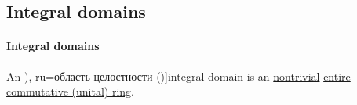 \subsection{Integral domains}\label{subsec:integral_domains}

\paragraph{Integral domains}

\begin{definition}\label{def:integral_domain}
  An \term[bg=област на цялостност (\cite[def. V.4]{ГеновИПр1991Алгебра}), ru=область целостности (\cite[def. 3.5.1]{Винберг2014Алгебра})]{integral domain} is an \hyperref[def:ring/trivial]{nontrivial} \hyperref[def:entire_semiring]{entire} \hyperref[def:ring/commutative]{commutative (unital) ring}.
\end{definition}

